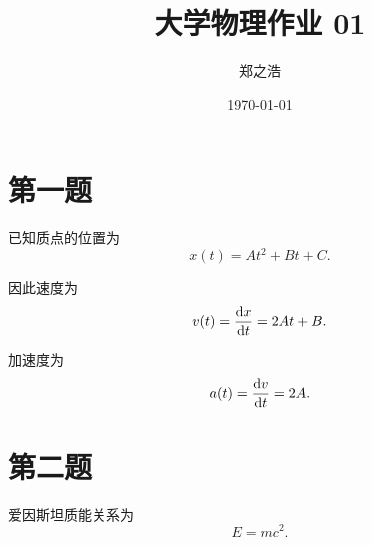 \documentclass[12pt]{ctexart}
\title{大学物理作业 01}
\author{郑之浩}
\date{\today}
\begin{document}
\maketitle

\section{第一题}

已知质点的位置为
\[
x(t)=At^2+Bt+C.
\]

因此速度为
\[
v(t)=\dv{x}{t}=2At+B.
\]

加速度为
\[
a(t)=\dv{v}{t}=2A.
\]

\section{第二题}

爱因斯坦质能关系为
\[
E=mc^2.
\]
\end{document}
